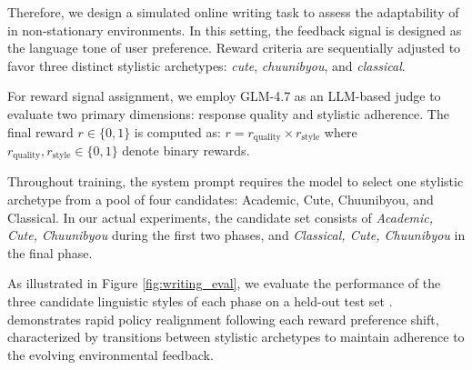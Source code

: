 Therefore, we design a simulated online writing task to assess the adaptability of \model in non-stationary environments. 
In this setting, the feedback signal is designed as the language tone of user preference.
Reward criteria are sequentially adjusted to favor three distinct stylistic archetypes: \textit{cute}, \textit{chuunibyou}, and \textit{classical}. 

 For reward signal assignment, we employ GLM-4.7\citep{2025glm} as an LLM-based judge to evaluate two primary dimensions: response quality and stylistic adherence. The final reward $r \in \{0, 1\}$ is computed as: $r = r_{\text{quality}} \times r_{\text{style}}$ where $r_{\text{quality}}, r_{\text{style}} \in \{0, 1\}$ denote binary rewards. 

Throughout training, the system prompt requires the model to select one stylistic archetype from a pool of four candidates: Academic, Cute, Chuunibyou, and Classical. In our actual experiments, the candidate set consists of \textit{Academic, Cute, Chuunibyou} during the first two phases, and \textit{Classical, Cute, Chuunibyou} in the final phase.

 As illustrated in Figure \ref{fig:writing_eval}, we evaluate the performance of the three candidate linguistic styles of each phase on a held-out test set
. \model demonstrates rapid policy realignment following each reward preference shift, characterized by transitions between stylistic archetypes to maintain adherence to the evolving environmental feedback.

